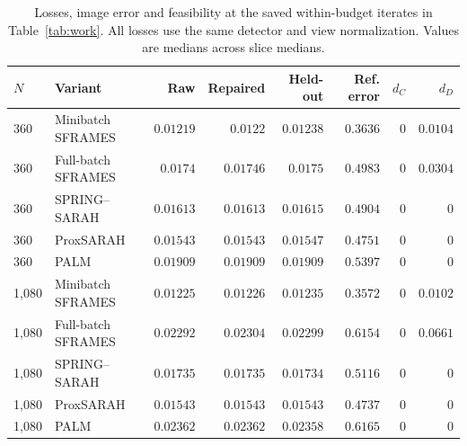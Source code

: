 \documentclass[11pt]{article}
\begin{document}
\begin{table}[!htbp]
\centering
\caption{Losses, image error and feasibility at the saved within-budget iterates in Table~\ref{tab:work}. All losses use the same detector and view normalization. Values are medians across slice medians.}
\label{tab:metrics}
\small
\setlength{\tabcolsep}{4pt}
\begin{tabular}{@{}llrrrrrr@{}}
\toprule
$N$ & Variant & Raw & Repaired & Held-out & Ref. error & $d_C$ & $d_D$ \\
\midrule
360 & Minibatch SFRAMES & $0.01219$ & $0.0122$ & $0.01238$ & $0.3636$ & $0$ & $0.0104$ \\
360 & Full-batch SFRAMES & $0.0174$ & $0.01746$ & $0.0175$ & $0.4983$ & $0$ & $0.0304$ \\
360 & SPRING--SARAH & $0.01613$ & $0.01613$ & $0.01615$ & $0.4904$ & $0$ & $0$ \\
360 & ProxSARAH & $0.01543$ & $0.01543$ & $0.01547$ & $0.4751$ & $0$ & $0$ \\
360 & PALM & $0.01909$ & $0.01909$ & $0.01909$ & $0.5397$ & $0$ & $0$ \\
1{,}080 & Minibatch SFRAMES & $0.01225$ & $0.01226$ & $0.01235$ & $0.3572$ & $0$ & $0.0102$ \\
1{,}080 & Full-batch SFRAMES & $0.02292$ & $0.02304$ & $0.02299$ & $0.6154$ & $0$ & $0.0661$ \\
1{,}080 & SPRING--SARAH & $0.01735$ & $0.01735$ & $0.01734$ & $0.5116$ & $0$ & $0$ \\
1{,}080 & ProxSARAH & $0.01543$ & $0.01543$ & $0.01543$ & $0.4737$ & $0$ & $0$ \\
1{,}080 & PALM & $0.02362$ & $0.02362$ & $0.02358$ & $0.6165$ & $0$ & $0$ \\
\bottomrule
\end{tabular}
\end{table}
\end{document}
